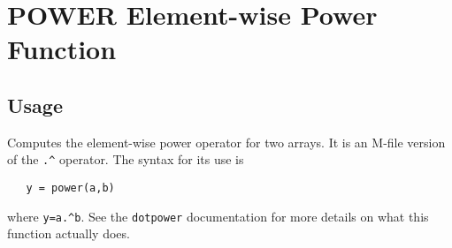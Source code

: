 \section{POWER Element-wise Power Function}

\subsection{Usage}

Computes the element-wise power operator for two arrays.  It is an
M-file version of the \verb|.^| operator.  The syntax for its use is
\begin{verbatim}
   y = power(a,b)
\end{verbatim}
where \verb|y=a.^b|.  See the \verb|dotpower| documentation for more
details on what this function actually does.

